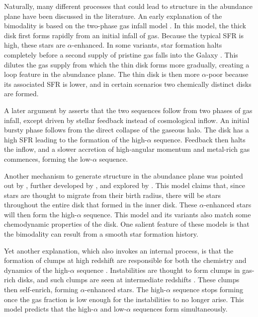 \documentclass[twocolumn,linenumbers,trackchanges]{aastex631}
\begin{document}
Naturally, many different processes that could lead to structure in the abundance plane have been discussed in the literature. An early explanation of the bimodality is based on the two-phase gas infall model \citep{1997ApJ...477..765C,2009IAUS..254..191C,2017MNRAS.472.3637G,2019A&A...623A..60S}. In this model, the thick disk first forms rapidly from an initial infall of gas. Because the typical SFR is high, these stars are $\alpha$-enhanced. In some variants, star formation halts completely before a second supply of pristine gas falls into the Galaxy \citep[][and references therein]{2024arXiv240511025S}. This dilutes the gas supply from which the thin disk forms more gradually, creating a loop feature in the abundance plane. The thin disk is then more $\alpha$-poor because its associated SFR is lower, and in certain scenarios two chemically distinct disks are formed.

A later argument by \citet{2021MNRAS.501.5176K} asserts that the two sequences follow from two phases of gas infall, except driven by stellar feedback instead of cosmological inflow. An initial bursty phase follows from the direct collapse of the gaseous halo. The disk has a high SFR leading to the formation of the high-$\alpha$ sequence. Feedback then halts the inflow, and a slower accretion of high-angular momentum and metal-rich gas commences, forming the low-$\alpha$ sequence.

Another mechanism to generate structure in the abundance plane was pointed out by \citet{2009MNRAS.396..203S}, further developed by \citet{2021MNRAS.507.5882S,2023MNRAS.523.3791C}, and explored by \citet{2011ApJ...737....8L,2021MNRAS.508.4484J}. This model claims that, since stars are thought to migrate from their birth radius, there will be stars throughout the entire disk that formed in the inner disk. These $\alpha$-enhanced stars will then form the high-$\alpha$ sequence. This model and its variants also match some chemodynamic properties of the disk. One salient feature of these models is that the bimodality can result from a smooth star formation history.

Yet another explanation, which also invokes an internal process, is that the formation of clumps at high redshift are responsible for both the chemistry and dynamics of the high-$\alpha$ sequence \citep{2019MNRAS.484.3476C,2020MNRAS.492.4716B,2021MNRAS.502..260B,2023ApJ...953..128G}. Instabilities are thought to form clumps in gas-rich disks, and such clumps are seen at intermediate redshifts \citep[$z\sim2$;][]{2005ApJ...627..632E,2007ApJ...658..763E}. These clumps then self-enrich, forming $\alpha$-enhanced stars. The high-$\alpha$ sequence stops forming once the gas fraction is low enough for the instabilities to no longer arise. This model predicts that the high-$\alpha$ and low-$\alpha$ sequences form simultaneously.
\end{document}

